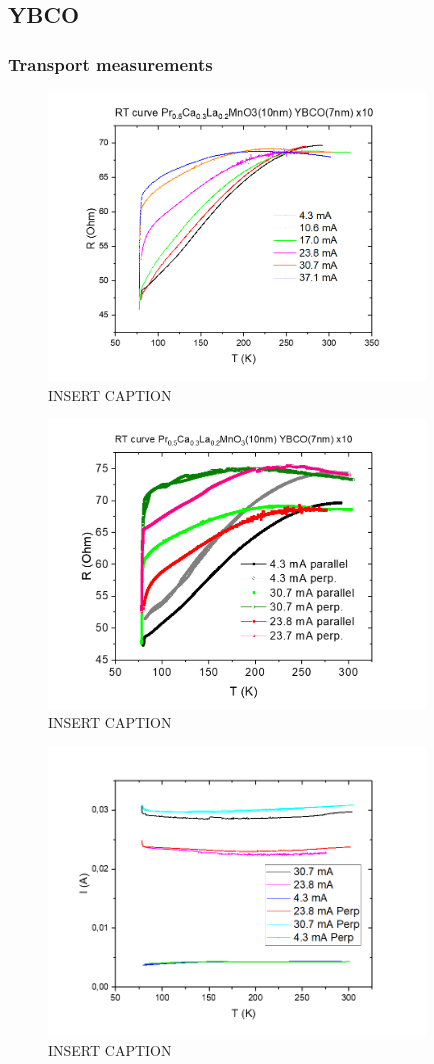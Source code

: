 \documentclass{comjnl}
\begin{document}
\subsection{YBCO}
\subsubsection{Transport measurements}
\begin{figure}[h]
\centering
\includegraphics[width=100mm]{Bilde1.png}
\caption{INSERT CAPTION \label{fig:res_norm}}
\end{figure}
\begin{figure}[h]
\centering
\includegraphics[width=100mm]{Bilde2.png}
\caption{INSERT CAPTION \label{fig:res}}
\end{figure}
\begin{figure}[h]
\centering
\includegraphics[width=100mm]{Bilde3.png}
\caption{INSERT CAPTION \label{fig:cur}}
\end{figure}
\end{document}
